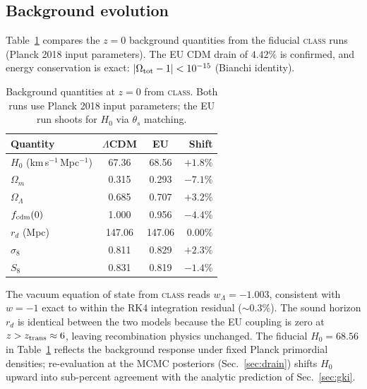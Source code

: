 \documentclass[a4paper,fleqn]{cas-dc}
\newcommand{\ztrans}{z_{\rm trans}}
\begin{document}
\subsection{Background evolution}
\label{sec:bg_results}

Table~\ref{tab:background} compares the $z = 0$ background
quantities from the fiducial \textsc{class} runs (Planck 2018
input parameters). The EU CDM drain of $4.42\%$ is confirmed,
and energy conservation is exact:
$|\Omega_{\rm tot} - 1| < 10^{-15}$ (Bianchi identity).

\begin{table}[t]
\caption{Background quantities at $z = 0$ from \textsc{class}.
Both runs use Planck 2018 input parameters; the EU run shoots
for $H_0$ via $\theta_s$ matching.}
\label{tab:background}
\begin{tabular}{lccr}
Quantity & $\Lambda$CDM & EU & Shift \\
\hline
$H_0$ (km\,s$^{-1}$\,Mpc$^{-1}$)      & 67.36 & 68.56 & $+1.8\%$  \\
$\Omega_m$             & 0.315 & 0.293 & $-7.1\%$  \\
$\Omega_\Lambda$       & 0.685 & 0.707 & $+3.2\%$  \\
$f_{\rm cdm}(0)$       & 1.000 & 0.956 & $-4.4\%$  \\
$r_d$ (Mpc)            & 147.06 & 147.06 & $0.00\%$ \\
$\sigma_8$             & 0.811 & 0.829 & $+2.3\%$  \\
$S_8$                  & 0.831 & 0.819 & $-1.4\%$  \\
\end{tabular}
\end{table}

The vacuum equation of state from \textsc{class} reads
$w_\Lambda = -1.003$, consistent with $w = -1$ exact to
within the RK4 integration residual ($\sim 0.3\%$).
The sound horizon $r_d$ is identical between the two models
because the EU coupling is zero at $z > \ztrans \approx 6$,
leaving recombination physics unchanged.
The fiducial $H_0 = 68.56$ in Table~\ref{tab:background}
reflects the background response under fixed Planck
primordial densities; re-evaluation at the MCMC posteriors
(Sec.~\ref{sec:drain}) shifts $H_0$ upward into sub-percent
agreement with the analytic prediction of
Sec.~\ref{sec:gki}.
\end{document}
